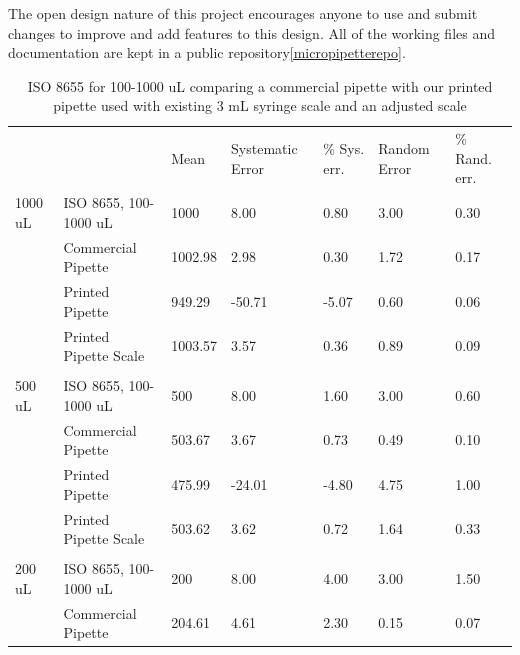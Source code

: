 \documentclass[10pt,letterpaper]{article}
\begin{document}
The open design nature of this project encourages anyone to use and submit changes to improve and add features to this design.
All of the working files and documentation are kept in a public repository\ref{micropipetterepo}.
\begin{table}[!ht]
\begin{adjustwidth}{-2.25in}{0in} %
\centering
\caption{ISO 8655 for 100-1000 uL comparing a commercial pipette with our printed pipette used with existing 3 mL syringe scale and an adjusted scale}
\label{table3}
\begin{tabular}{lllllll}
        &                       & Mean   & Systematic Error & \% Sys. err. & Random Error & \% Rand. err. \\
1000 uL & ISO 8655, 100-1000 uL & 1000    & 8.00             & 0.80         & 3.00         & 0.30          \\
        & Commercial Pipette    & 1002.98 & 2.98             & 0.30         & 1.72         & 0.17          \\
        & Printed Pipette       & 949.29  & -50.71           & -5.07        & 0.60         & 0.06          \\
        & Printed Pipette Scale & 1003.57 & 3.57             & 0.36         & 0.89         & 0.09          \\
        &                       &         &                  &              &              &               \\
500 uL  & ISO 8655, 100-1000 uL & 500     & 8.00             & 1.60         & 3.00         & 0.60          \\
        & Commercial Pipette    & 503.67  & 3.67             & 0.73         & 0.49         & 0.10          \\
        & Printed Pipette       & 475.99  & -24.01           & -4.80        & 4.75         & 1.00          \\
        & Printed Pipette Scale & 503.62  & 3.62             & 0.72         & 1.64         & 0.33          \\
        &                       &         &                  &              &              &               \\
200 uL  & ISO 8655, 100-1000 uL & 200     & 8.00             & 4.00         & 3.00         & 1.50          \\
        & Commercial Pipette    & 204.61  & 4.61             & 2.30         & 0.15         & 0.07          \\

\end{tabular}
\end{adjustwidth}
\end{table}
\end{document}
